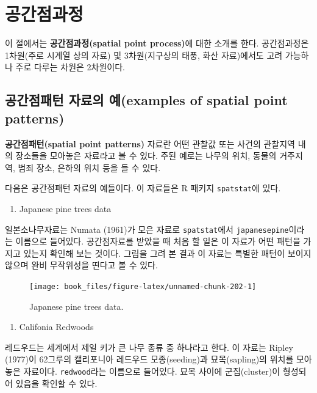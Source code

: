 \documentclass[b5paper,]{scrbook}
\providecommand{\tightlist}{%
  \setlength{\itemsep}{0pt}\setlength{\parskip}{0pt}}
\theoremstyle{plain}
\theoremstyle{definition}
\numberwithin{equation}{section}
\begin{document}
\chapter{공간점과정}\label{pointpattern}

이 절에서는 \textbf{공간점과정(spatial point process)}에 대한 소개를
한다. 공간점과정은 1차원(주로 시계열 상의 자료) 및 3차원(지구상의 태풍,
화산 자료)에서도 고려 가능하나 주로 다루는 차원은 2차원이다.

\section{공간점패턴 자료의 예(examples of spatial point
patterns)}\label{--examples-of-spatial-point-patterns}

\textbf{공간점패턴(spatial point patterns)} 자료란 어떤 관찰값 또는
사건의 관찰지역 내의 장소들을 모아놓은 자료라고 볼 수 있다. 주된 예로는
나무의 위치, 동물의 거주지역, 범죄 장소, 은하의 위치 등을 들 수 있다.

다음은 공간점패턴 자료의 예들이다. 이 자료들은 R 패키지
\texttt{spatstat}에 있다.

\begin{enumerate}
\def\labelenumi{\arabic{enumi}.}
\tightlist
\item
  Japanese pine trees data
\end{enumerate}

일본소나무자료는 Numata (1961)가 모은 자료로 \texttt{spatstat}에서
\texttt{japanesepine}이라는 이름으로 들어있다. 공간점자료를 받았을 때
처음 할 일은 이 자료가 어떤 패턴을 가지고 있는지 확인해 보는 것이다.
그림을 그려 본 결과 이 자료는 특별한 패턴이 보이지 않으며 완비
무작위성을 띤다고 볼 수 있다.

\begin{figure}

{\centering \texttt{[image: book\_files/figure-latex/unnamed-chunk-202-1]} 

}

\caption{Japanese pine trees data.}\label{fig:unnamed-chunk-202}
\end{figure}

\begin{enumerate}
\def\labelenumi{\arabic{enumi}.}
\setcounter{enumi}{1}
\tightlist
\item
  Califonia Redwoods
\end{enumerate}

레드우드는 세계에서 제일 키가 큰 나무 종류 중 하나라고 한다. 이 자료는
Ripley (1977)이 62그루의 캘리포니아 레드우드 모종(seeding)과
묘목(sapling)의 위치를 모아놓은 자료이다. \texttt{redwood}라는 이름으로
들어있다. 묘목 사이에 군집(cluster)이 형성되어 있음을 확인할 수 있다.
\end{document}
